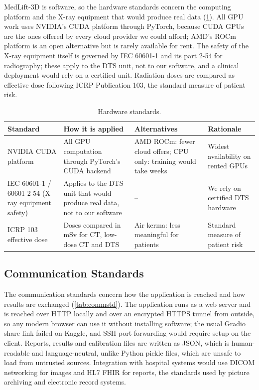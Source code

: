 MedLift-3D is software, so the hardware standards concern the computing platform and the X-ray equipment that would produce real data (\cref{tab:hwstd}). All GPU work uses NVIDIA's CUDA platform through PyTorch, because CUDA GPUs are the ones offered by every cloud provider we could afford; AMD's ROCm platform is an open alternative but is rarely available for rent. The safety of the X-ray equipment itself is governed by IEC 60601-1 and its part 2-54 for radiography; these apply to the DTS unit, not to our software, and a clinical deployment would rely on a certified unit. Radiation doses are compared as effective dose following ICRP Publication 103, the standard measure of patient risk.

\begin{table}[!htbp]
\centering\small
\caption{Hardware standards.}
\label{tab:hwstd}
\begin{tabularx}{\linewidth}{>{\raggedright\arraybackslash}p{3.2cm} >{\raggedright\arraybackslash}X >{\raggedright\arraybackslash}X >{\raggedright\arraybackslash}X}
\toprule
Standard & How it is applied & Alternatives & Rationale \\
\midrule
NVIDIA CUDA platform & All GPU computation through PyTorch's CUDA backend & AMD ROCm: fewer cloud offers; CPU only: training would take weeks & Widest availability on rented GPUs \\
IEC 60601-1 / 60601-2-54 (X-ray equipment safety) & Applies to the DTS unit that would produce real data, not to our software & -- & We rely on certified DTS hardware \\
ICRP 103 effective dose~\cite{icrp103} & Doses compared in mSv for CT, low-dose CT and DTS & Air kerma: less meaningful for patients & Standard measure of patient risk \\
\bottomrule
\end{tabularx}
\end{table}

\subsection{Communication Standards}

The communication standards concern how the application is reached and how results are exchanged (\cref{tab:commstd}). The application runs as a web server and is reached over HTTP locally and over an encrypted HTTPS tunnel from outside, so any modern browser can use it without installing software; the usual Gradio share link failed on Kaggle, and SSH port forwarding would require setup on the client. Reports, results and calibration files are written as JSON, which is human-readable and language-neutral, unlike Python pickle files, which are unsafe to load from untrusted sources. Integration with hospital systems would use DICOM networking for images and HL7 FHIR for reports, the standards used by picture archiving and electronic record systems.

